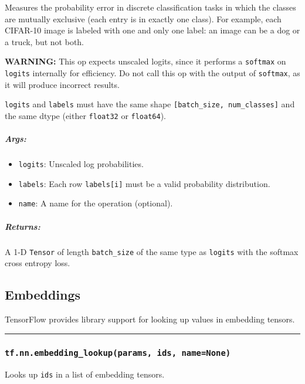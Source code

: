Measures the probability error in discrete classification tasks in which
the classes are mutually exclusive (each entry is in exactly one class).
For example, each CIFAR-10 image is labeled with one and only one label:
an image can be a dog or a truck, but not both.

\textbf{WARNING:} This op expects unscaled logits, since it performs a
\texttt{softmax} on \texttt{logits} internally for efficiency. Do not
call this op with the output of \texttt{softmax}, as it will produce
incorrect results.

\texttt{logits} and \texttt{labels} must have the same shape
\texttt{{[}batch\_size,\ num\_classes{]}} and the same dtype (either
\texttt{float32} or \texttt{float64}).

\subparagraph{Args: }\label{args-19}

\begin{itemize}
\tightlist
\item
  \texttt{logits}: Unscaled log probabilities.
\item
  \texttt{labels}: Each row \texttt{labels{[}i{]}} must be a valid
  probability distribution.
\item
  \texttt{name}: A name for the operation (optional).
\end{itemize}

\subparagraph{Returns: }\label{returns-19}

A 1-D \texttt{Tensor} of length \texttt{batch\_size} of the same type as
\texttt{logits} with the softmax cross entropy loss.

\subsection{Embeddings }\label{embeddings}

TensorFlow provides library support for looking up values in embedding
tensors.

\begin{center}\rule{0.5\linewidth}{\linethickness}\end{center}

\subsubsection{\texorpdfstring{\texttt{tf.nn.embedding\_lookup(params,\ ids,\ name=None)}
}{tf.nn.embedding\_lookup(params, ids, name=None) }}\label{tf.nn.embeddingux5flookupparams-ids-namenone}

Looks up \texttt{ids} in a list of embedding tensors.

